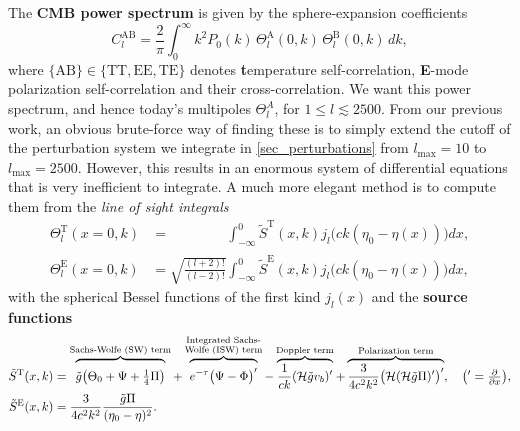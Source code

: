 \documentclass[10pt,a4paper]{article}
\begin{document}
The \textbf{CMB power spectrum} is given by the sphere-expansion coefficients
\begin{equation}
	C^{\textrm{AB}}_l = \frac{2}{\pi} \int_0^\infty k^2 P_0(k) \, \Theta_l^\text{A}(0,k) \, \Theta_l^\text{B}(0,k) \, dk,
\label{eq_Cl}
\end{equation}
where $\{\text{AB}\} \in \{\text{TT},\text{EE},\text{TE}\}$ denotes \textbf{t}emperature self-correlation, \textbf{E}-mode polarization self-correlation and their cross-correlation.
We want this power spectrum, and hence today's multipoles $\Theta^A_l$, for $1 \leq l \lesssim 2500$.
From our previous work,
an obvious brute-force way of finding these is to simply extend the cutoff of the perturbation system we integrate in \cref{sec_perturbations} from $l_\text{max} = 10$ to $l_\text{max} = 2500$.
However, this results in an enormous system of differential equations that is very inefficient to integrate.
A much more elegant method is to compute them from the \emph{line of sight integrals}
\begin{subequations}
\begin{align}
	\Theta^\text{T}_l(x=0,k) &= \phantom{\sqrt{\frac{(l+2)!}{(l-2)!}}} \int_{-\infty}^0 \tilde{S}^\text{T}(x,k) j_l\big(ck(\eta_0-\eta(x))\big) dx, \\
	\Theta^\text{E}_l(x=0,k) &= \sqrt{\frac{(l+2)!}{(l-2)!}} \int_{-\infty}^0 \tilde{S}^\text{E}(x,k) j_l\big(ck(\eta_0-\eta(x))\big) dx,
\end{align}
\label{eq_Thetal0}
\end{subequations}
with the spherical Bessel functions of the first kind $j_l(x)$ and the \textbf{source functions}
\begin{subequations}
\begin{align}
	\tilde{S}^\text{T}(x,k) &= \overbrace{\vphantom{\frac1c} \tilde{g} \big( \Theta_0 + \Psi + \tfrac14 \Pi \big)}^\text{Sachs-Wolfe (SW) term} + \overbrace{\vphantom{\frac1c} e^{-\tau} \big( \Psi - \Phi \big)^\prime}^{\substack{\text{Integrated Sachs-}\\\text{Wolfe (ISW) term}}} - \overbrace{\frac{1}{ck} (\mathcal{H} \tilde{g} v_b)^\prime}^{\text{Doppler term}} + \overbrace{\frac{3}{4c^2k^2} \big( \mathcal{H} (\mathcal{H} \tilde{g} \Pi)^\prime \big)^\prime}^{\text{Polarization term}}, \quad \big( {}^\prime = \tfrac{\partial}{\partial x} \big), \\
	\tilde{S}^\text{E}(x,k) &= \frac{3}{4 c^2 k^2} \frac{\tilde{g} \Pi}{(\eta_0-\eta)^2}.
\end{align}
\label{eq_S}
\end{subequations}
\end{document}
